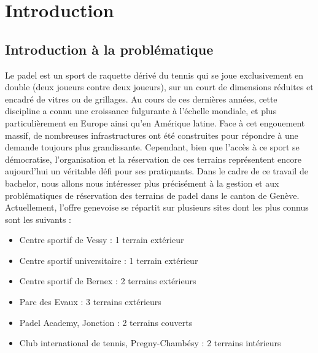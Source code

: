 \documentclass[12pt]{article}
\let\stdsection\section
\renewcommand{\section}{\clearpage\stdsection}
\begin{document}
\newpage

\listoffigures

\newpage

\tableofcontents
\newpage


\section{Introduction}
\subsection{Introduction à la problématique}
Le padel est un sport de raquette dérivé du tennis qui se joue exclusivement en double (deux joueurs contre deux joueurs), sur un court de dimensions réduites et encadré de vitres ou de grillages. Au cours de ces dernières années, cette discipline a connu une croissance fulgurante à l'échelle mondiale, et plus particulièrement en Europe ainsi qu'en Amérique latine. Face à cet engouement massif, de nombreuses infrastructures ont été construites pour répondre à une demande toujours plus grandissante. Cependant, bien que l'accès à ce sport se démocratise, l'organisation et la réservation de ces terrains représentent encore aujourd'hui un véritable défi pour ses pratiquants.
\newline\newline
Dans le cadre de ce travail de bachelor, nous allons nous intéresser plus précisément à la gestion et aux problématiques de réservation des terrains de padel dans le canton de Genève. Actuellement, l'offre genevoise se répartit sur plusieurs sites dont les plus connus sont les suivants :
\newline
\begin{itemize}
    \item Centre sportif de Vessy : 1 terrain extérieur
    \item Centre sportif universitaire : 1 terrain extérieur
    \item Centre sportif de Bernex : 2 terrains extérieurs
    \item Parc des Evaux : 3 terrains extérieurs
    \item Padel Academy, Jonction : 2 terrains couverts
    \item Club international de tennis, Pregny-Chambésy : 2 terrains intérieurs
\end{itemize}\
\end{document}
